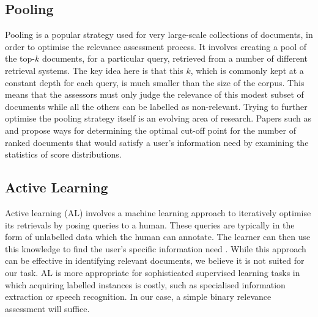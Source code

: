 \documentclass{l4proj}
\begin{document}
\subsection{Pooling}
\label{sec:background_pooling}
Pooling is a popular strategy used for very large-scale collections of documents, in order to optimise the relevance assessment process. It involves creating a pool of the top-$k$ documents, for a particular query, retrieved from a number of different retrieval systems. The key idea here is that this $k$, which is commonly kept at a constant depth for each query, is much smaller than the size of the corpus. This means that the assessors must only judge the relevance of this modest subset of documents while all the others can be labelled as non-relevant. Trying to further optimise the pooling strategy itself is an evolving area of research. Papers such as \cite{arampatzis2009stop} and \cite{lien2019assumption} propose ways for determining the optimal cut-off point for the number of ranked documents that would satisfy a user's information need by examining the statistics of score distributions.


\subsection{Active Learning}
Active learning (AL) involves a machine learning approach to iteratively optimise its retrievals by posing queries to a human. These queries are typically in the form of unlabelled data which the human can annotate. The learner can then use this knowledge to find the user's specific information need \citep{burr2012al}. While this approach can be effective in identifying relevant documents, we believe it is not suited for our task. AL is more appropriate for sophisticated supervised learning tasks in which acquiring labelled instances is costly, such as specialised information extraction or speech recognition. In our case, a simple binary relevance assessment will suffice.
\end{document}
